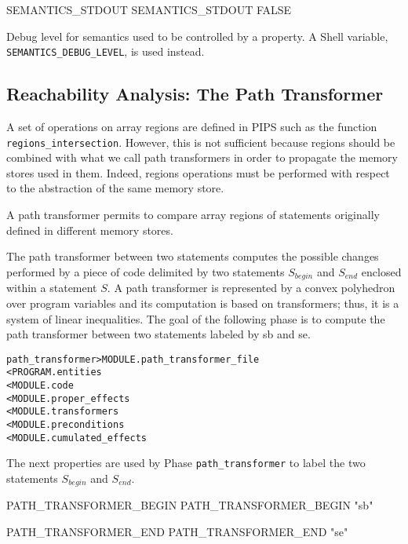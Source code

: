 \documentclass[a4paper]{report}
\newenvironment{PipsMake}{\begin{alltt}}{\end{alltt}}
\begin{document}
\begin{PipsProp}{SEMANTICS_STDOUT}
SEMANTICS_STDOUT FALSE
\end{PipsProp}

Debug level for semantics used to be controlled by a property. A Shell
variable, \verb/SEMANTICS_DEBUG_LEVEL/, is used instead.

\subsection{Reachability Analysis: The Path Transformer} 
A set of operations on array regions are defined in PIPS such as the function \texttt{regions\_intersection}. However, this is not sufficient because regions should be combined with what we call path transformers in order to propagate the memory stores used in them. Indeed, regions operations must be performed with respect to the abstraction of the same memory store. 

A path transformer permits to compare array regions of statements originally defined in different memory stores.   

 The path transformer between two statements computes the possible changes performed by a piece of code delimited by two statements $S_{begin}$ and $S_{end}$ enclosed within a statement $S$. A path transformer is represented by a convex polyhedron over program variables and its computation is based on transformers; thus, it is a system of linear inequalities.
The goal of the following phase is to compute the path transformer
between two statements labeled by sb and se.


\begin{PipsMake}
path_transformer                 > MODULE.path_transformer_file                    
        < PROGRAM.entities                  
        < MODULE.code
        < MODULE.proper_effects
        < MODULE.transformers
        < MODULE.preconditions
        < MODULE.cumulated_effects
\end{PipsMake}

The next properties are used by Phase \texttt{path\_transformer} to
label the two statements $S_{begin}$ and $S_{end}$.

\begin{PipsProp}{PATH_TRANSFORMER_BEGIN}
PATH_TRANSFORMER_BEGIN "sb"
\end{PipsProp}

\begin{PipsProp}{PATH_TRANSFORMER_END}
PATH_TRANSFORMER_END "se"
\end{PipsProp}
\end{document}
